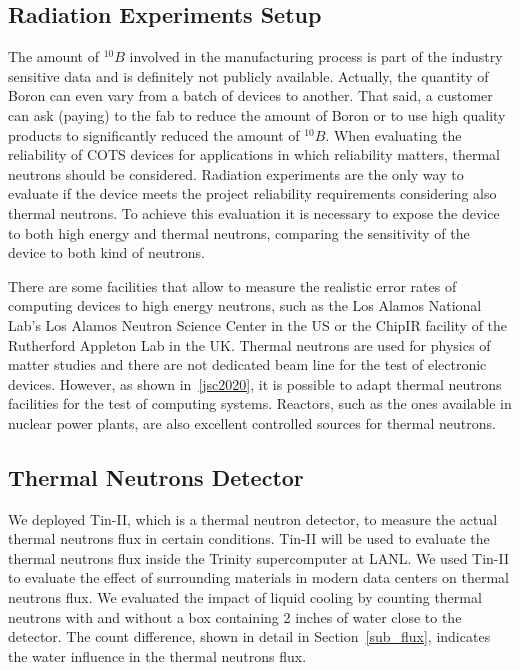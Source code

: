 \subsection{Radiation Experiments Setup}
\label{sub_beam_setup}

The amount of $^{10}B$ involved in the manufacturing process is part of the industry sensitive data and is definitely not publicly available. Actually, the quantity of Boron can even vary from a batch of devices to another. That said, a customer can ask (paying) to the fab to reduce the amount of Boron or to use high quality products to significantly reduced the amount of $^{10}B$. When evaluating the reliability of COTS devices for applications in which reliability matters, thermal neutrons should be considered. Radiation experiments are the only way to evaluate if the device meets the project reliability requirements considering also thermal neutrons. To achieve this evaluation it is necessary to expose the device to both high energy and thermal neutrons, comparing the sensitivity of the device to both kind of neutrons.

There are some facilities that allow to measure the realistic error rates of computing devices to high energy neutrons, such as the Los Alamos National Lab's Los Alamos Neutron Science Center in the US or the ChipIR facility of the Rutherford Appleton Lab in the UK. Thermal neutrons are used for physics of matter studies and there are not dedicated beam line for the test of electronic devices. However, as shown in~\ref{jsc2020}, it is possible to adapt thermal neutrons facilities for the test of computing systems. Reactors, such as the ones available in nuclear power plants, are also excellent controlled sources for thermal neutrons.

\subsection{Thermal Neutrons Detector}
\label{sub_detector}

We deployed Tin-II, which is a thermal neutron detector,  to measure the actual thermal neutrons flux in certain conditions. Tin-II will be used to evaluate the thermal neutrons flux inside the Trinity supercomputer at LANL.  We used Tin-II to evaluate the effect of surrounding materials in modern data centers on thermal neutrons flux. We evaluated the impact of liquid cooling by counting thermal neutrons with and without a box containing 2 inches of water close to the detector. The count difference, shown in detail in Section~\ref{sub_flux}, indicates the water influence in the thermal neutrons flux.

